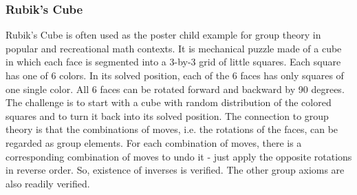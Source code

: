 







\subsubsection{Rubik's Cube} Rubik's Cube is often used as the poster child example for group theory in popular and recreational math contexts. It is mechanical puzzle made of a cube in which each face is segmented into a 3-by-3 grid of little squares. Each square has one of 6 colors. In its solved position, each of the 6 faces has only squares of one single color. All 6 faces can be rotated forward and backward by 90 degrees. The challenge is to start with a cube with random distribution of the colored squares and to turn it back into its solved position. The connection to group theory is that the combinations of moves, i.e. the rotations of the faces, can be regarded as group elements. For each combination of moves, there is a corresponding combination of moves to undo it - just apply the opposite rotations in reverse order. So, existence of inverses is verified. The other group axioms are also readily verified.

